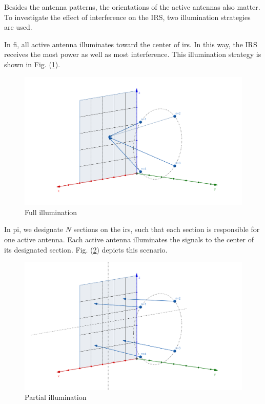 \documentclass[12pt,draftclsnofoot,onecolumn,journal]{IEEEtran}
\begin{document}
Besides the antenna patterns, the orientations of the active antennas also matter. To investigate the effect of interference on the IRS, two illumination strategies are used. 

In \ac{fi}, all active antenna illuminates toward the center of \ac{irs}. In this way, the IRS receives the most power as well as most interference. This illumination strategy is shown in Fig. (\ref{fig:fi}).
\begin{figure}[htbp]
\includegraphics[width=6in]{fullillumination.png} 
\caption{Full illumination} \label{fig:fi}
\end{figure}

In \ac{pi}, we designate $N$ sections on the \ac{irs}, such that each section is responsible for one active antenna. Each active antenna illuminates the signals to the center of its designated section. Fig. (\ref{fig:pi}) depicts this scenario.
\begin{figure}[htbp]
\includegraphics[width=6in]{partialillumination.png} 
\caption{Partial illumination} \label{fig:pi}
\end{figure}
\end{document}
